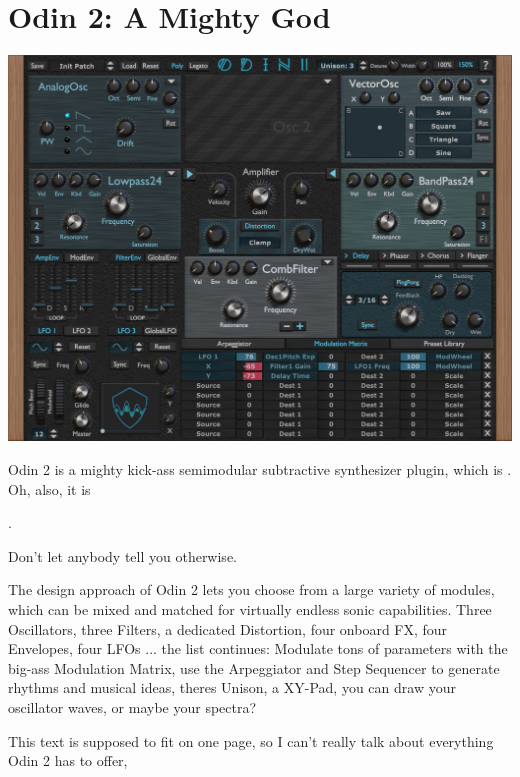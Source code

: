 \clearpage
\section{Odin 2: A Mighty God}
\begin{center}
    \includegraphics[width=\textwidth]{graphics/mighty_god.png}
\end{center}

Odin 2 is a mighty kick-ass semimodular subtractive synthesizer plugin, which is . Oh, also, it is

\begin{center}
    .
\end{center}

Don't let anybody tell you otherwise. 

\vspace{1mm}
The design approach of Odin 2 lets you choose from a large variety of modules, which can be mixed and matched for virtually endless sonic capabilities. Three Oscillators, three Filters, a dedicated Distortion, four onboard FX, four Envelopes, four LFOs ... the list continues: Modulate tons of parameters with the big-ass Modulation Matrix, use the Arpeggiator and Step Sequencer to generate rhythms and musical ideas, theres Unison, a XY-Pad, you can draw your oscillator waves, or maybe your spectra?

\vspace{2mm}
This text is supposed to fit on one page, so I can't really talk about everything Odin 2 has to offer,

\begin{center}
\end{center}

